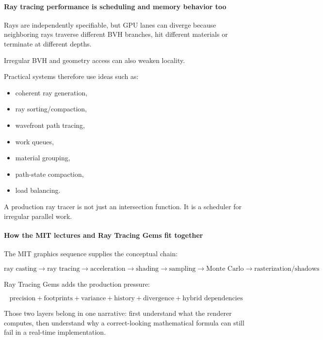 \paragraph{Ray tracing performance is scheduling and memory behavior too}\label{ray-tracing-performance-is-scheduling-and-memory-behavior-too}

Rays are independently specifiable, but GPU lanes can diverge because neighboring rays traverse different BVH branches, hit different materials or terminate at different depths.

Irregular BVH and geometry access can also weaken locality.

Practical systems therefore use ideas such as:

\begin{itemize}
\tightlist
\item
  coherent ray generation,
\item
  ray sorting/compaction,
\item
  wavefront path tracing,
\item
  work queues,
\item
  material grouping,
\item
  path-state compaction,
\item
  load balancing.
\end{itemize}

A production ray tracer is not just an intersection function. It is a scheduler for irregular parallel work.

\paragraph{How the MIT lectures and Ray Tracing Gems fit together}\label{how-the-mit-lectures-and-ray-tracing-gems-fit-together}

The MIT graphics sequence supplies the conceptual chain:

\[
\text{ray casting}
\rightarrow
\text{ray tracing}
\rightarrow
\text{acceleration}
\rightarrow
\text{shading}
\rightarrow
\text{sampling}
\rightarrow
\text{Monte Carlo}
\rightarrow
\text{rasterization/shadows}
\]

Ray Tracing Gems adds the production pressure:

\[
\boxed{
\text{precision}
+
\text{footprints}
+
\text{variance}
+
\text{history}
+
\text{divergence}
+
\text{hybrid dependencies}
}
\]

Those two layers belong in one narrative: first understand what the renderer computes, then understand why a correct-looking mathematical formula can still fail in a real-time implementation.

